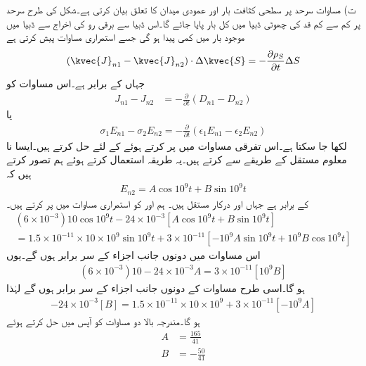 ت) مساوات  سرحد پر سطحی کثافت بار  اور عمودی میدان کا تعلق بیان کرتی ہے۔شکل  کی طرح سرحد پر کم سے کم قد  کی چھوٹی ڈبیا میں کل  بار پایا جائے گا۔اس ڈبیا سے برقی رو کی اخراج سے ڈبیا میں موجود بار میں کمی پیدا ہو گی جسے استمراری مساوات پیش کرتی ہے
\begin{align*}
(\kvec{J}_{n1}-\kvec{J}_{n2}) \cdot \Delta \kvec{S} = -\frac{\partial \rho_S}{\partial t} \Delta S
\end{align*}
جہاں  کے برابر ہے۔اس  مساوات کو 
\begin{align*}
J_{n1}-J_{n2}&=-\frac{\partial}{\partial t} (D_{n1}-D_{n2})
\end{align*}
یا
\begin{align*}
\sigma_1 E_{n1}-\sigma_2 E_{n2}=-\frac{\partial }{\partial t} (\epsilon_1 E_{n1}-\epsilon_2 E_{n2})
\end{align*}
لکھا جا سکتا ہے۔اس تفرقی مساوات میں  پر کرتے ہوئے  کے لئے حل کرتے ہیں۔ایسا نا معلوم مستقل کے طریقے سے کرتے ہیں۔یہ طریقہ استعمال کرتے ہوئے ہم تصور کرتے ہیں کہ
\begin{align*}
E_{n2}=A \cos 10^9 t + B \sin 10^9 t
\end{align*}
کے برابر ہے جہاں  اور  درکار مستقل ہیں۔ ہم  اور  کو استمراری مساوات میں پر کرتے ہیں۔
\begin{multline*}
(6\times 10^{-3}) 10 \cos 10^9 t -24\times 10^{-3} [A \cos 10^9 t +B \sin 10^9 t]\\
=1.5\times 10^{-11} \times 10 \times 10^9 \sin 10^9 t+3\times 10^{-11}[-10^9 A \sin 10^9 t +10^9 B \cos 10^9 t ]
\end{multline*}
اس مساوات میں دونوں جانب  اجزاء کے سر برابر ہوں گے۔یوں
\begin{align*}
(6\times 10^{-3}) 10 -24 \times 10^{-3}A = 3\times 10^{-11} [10^9 B]
\end{align*}
ہو گا۔اسی طرح مساوات کے دونوں جانب  اجزاء کے سر برابر ہوں گے لہٰذا
\begin{align*}
-24\times 10^{-3}[B]=1.5\times 10^{-11} \times 10 \times 10^9+3\times 10^{-11}[-10^9 A]
\end{align*}
ہو گا۔مندرجہ بالا دو مساوات کو آپس میں حل کرتے ہوئے
\begin{align*}
A&=\frac{165}{41}\\
B&=-\frac{50}{41}
\end{align*}
